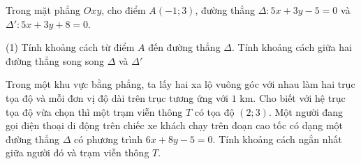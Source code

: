 \begin{vd} 
	Trong mặt phẳng $Oxy$, cho điểm $A(-1;3)$, đường thẳng $ \Delta \colon 5x+3y-5=0$ và $\Delta '\colon 5x+3y+8=0.$
	\begin{tasks}(1)
		\task Tính khoảng cách từ điểm $A$ đến đường thẳng $ \Delta .$
		\task Tính khoảng cách giữa hai đường thẳng song song $ \Delta $ và $\Delta'$
	\end{tasks}
	
\end{vd}

\begin{vd}%
	Trong một khu vực bằng phẳng, ta lấy hai xa lộ vuông góc với nhau làm hai trục tọa độ và mỗi đơn vị độ dài trên trục tương ứng với $1$ km. Cho biết với hệ trục tọa độ vừa chọn thì một trạm viễn thông $T$ có tọa độ $(2;3)$. Một người đang gọi điện thoại di động trên chiếc xe khách chạy trên đoạn cao tốc có dạng một đường thẳng $\Delta$ có phương trình $6x+8y-5=0$. Tính khoảng cách ngắn nhất giữa người đó và trạm viễn thông $T$.
\end{vd}

